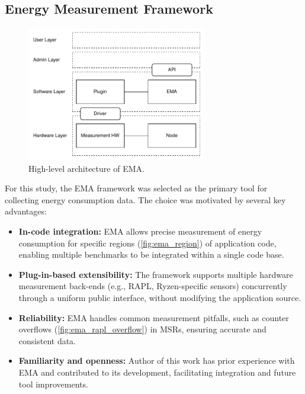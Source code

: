 \subsection{Energy Measurement Framework}

\begin{figure}[htbp]
    \centering
    \includegraphics[width=0.7\textwidth]{assets/ema_arch}
    \caption{High-level architecture of \gls{EMA}.}
    \label{fig:ema_arch}
\end{figure}

For this study, the \gls{EMA} framework was selected as the primary tool
for collecting energy consumption data. The choice was motivated by several
key advantages:

\begin{itemize}
    \item \textbf{In-code integration:} \gls{EMA} allows precise measurement
          of energy consumption for specific regions (\cref{fig:ema_region})
          of application code, enabling multiple benchmarks to be integrated
          within a single code base.
    \item \textbf{Plug-in-based extensibility:} The framework supports multiple
          hardware measurement back-ends (e.g., \gls{RAPL}, Ryzen-specific
          sensors) concurrently through a uniform public interface, without
          modifying the application source.
    \item \textbf{Reliability:} \gls{EMA} handles common measurement
          pitfalls, such as counter overflows (\cref{fig:ema_rapl_overflow})
          in \gls{MSR}s, ensuring accurate and consistent data.
    \item \textbf{Familiarity and openness:} Author of this work has prior
          experience with \gls{EMA} and contributed to its development,
          facilitating integration and future tool improvements.
\end{itemize}

